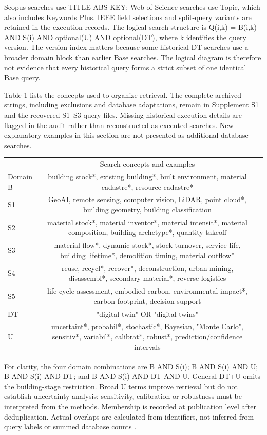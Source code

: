 Scopus searches use TITLE-ABS-KEY; Web of Science searches use Topic, which also includes Keywords Plus. IEEE field selections and split-query variants are retained in the execution records. The logical search structure is Q(i,k) = B(i,k) AND S(i) AND optional(U) AND optional(DT), where k identifies the query version. The version index matters because some historical DT searches use a broader domain block than earlier Base searches. The logical diagram is therefore not evidence that every historical query forms a strict subset of one identical Base query.

Table 1 lists the concepts used to organize retrieval. The complete archived strings, including exclusions and database adaptations, remain in Supplement S1 and the recovered S1–S3 query files. Missing historical execution details are flagged in the audit rather than reconstructed as executed searches. New explanatory examples in this section are not presented as additional database searches.

\begin{longtable}{p{7.75cm}cm}}
Block & Search concepts and examples\\
Domain B & building stock*, existing building*, built environment, material cadastre*, resource cadastre*\\
S1 & GeoAI, remote sensing, computer vision, LiDAR, point cloud*, building geometry, building classification\\
S2 & material stock*, material inventor*, material intensit*, material composition, building archetype*, quantity takeoff\\
S3 & material flow*, dynamic stock*, stock turnover, service life, building lifetime*, demolition timing, material outflow*\\
S4 & reuse, recycl*, recover*, deconstruction, urban mining, disassembl*, secondary material*, reverse logistics\\
S5 & life cycle assessment, embodied carbon, environmental impact*, carbon footprint, decision support\\
DT & "digital twin" OR "digital twins"\\
U & uncertaint*, probabil*, stochastic*, Bayesian, "Monte Carlo", sensitiv*, variabil*, calibrat*, robust*, prediction/confidence intervals\\
\end{longtable}
For clarity, the four domain combinations are B AND S(i); B AND S(i) AND U; B AND S(i) AND DT; and B AND S(i) AND DT AND U. General DT+U omits the building-stage restriction. Broad U terms improve retrieval but do not establish uncertainty analysis: sensitivity, calibration or robustness must be interpreted from the methods. Membership is recorded at publication level after deduplication. Actual overlaps are calculated from identifiers, not inferred from query labels or summed database counts \citep{M02}.

